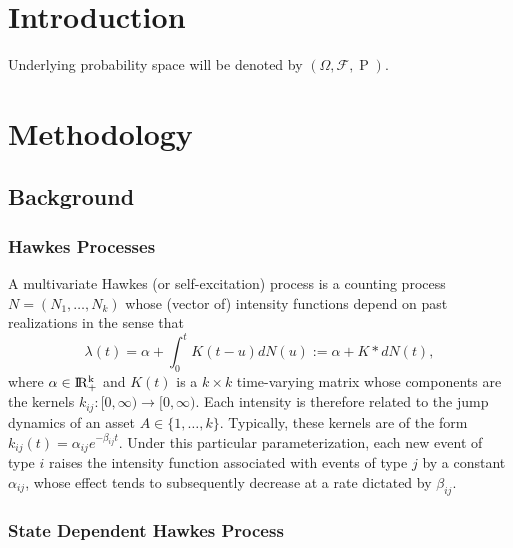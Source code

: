 \documentclass[11pt]{article}
\DeclareMathOperator{\Prob}{P}
\newcommand{\R}{\rm I\!R}
\begin{document}
\section{Introduction}

Underlying probability space will be denoted by \((\Omega,\mathcal{F},\Prob)\).


\section{Methodology}

\subsection{Background}

\subsubsection{Hawkes Processes}

A multivariate Hawkes (or self-excitation) process is a counting process \(N=(N_1,\dots,N_k)\) whose (vector of) intensity functions depend on past realizations in the sense that
\begin{equation*}
\lambda(t)
=\alpha+\int_0^tK(t-u)dN(u)
:=\alpha+K*dN(t),
\end{equation*}
where \(\alpha\in\R_+^k\) and \(K(t)\) is a \(k\times k\) time-varying matrix whose components are the kernels \(k_{ij}:[0,\infty)\to[0,\infty)\). Each intensity is therefore related to the jump dynamics of an asset \(A\in\{1,\dots,k\}\). Typically, these kernels are of the form \(k_{ij}(t)=\alpha_{ij}e^{-\beta_{ij}t}\). Under this particular parameterization, each new event of type \(i\) raises the intensity function associated with events of type \(j\) by a constant \(\alpha_{ij}\), whose effect tends to subsequently decrease at a rate dictated by \(\beta_{ij}\).

\subsubsection{State Dependent Hawkes Process}
\end{document}
